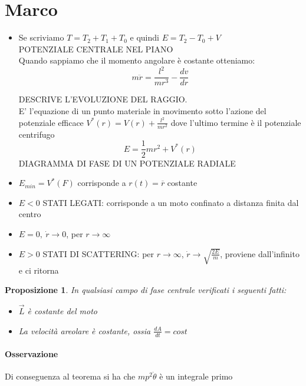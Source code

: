 \documentclass[a4paper,12pt]{article}
\begin{document}
\section{Marco}
\begin{itemize}


\item Se scriviamo $T=T_2+T_1+T_0$ e quindi $E=T_2-T_0+V$ \\
POTENZIALE CENTRALE NEL PIANO \\
Quando sappiamo che il momento angolare è costante otteniamo:
\begin{displaymath}
m\ddot{r}=\frac{l^2}{mr^3}-\frac{dv}{dr}
\end{displaymath}

DESCRIVE L'EVOLUZIONE DEL RAGGIO.\\
E' l'equazione di un punto materiale in movimento sotto l'azione del potenziale efficace $V^*(r)=V(r)+\frac{l^2}{mr^2}$ dove l'ultimo termine è il potenziale centrifugo
\begin{displaymath}
E=\frac{1}{2}mr^2 + V^*(r)
\end{displaymath}
DIAGRAMMA DI FASE DI UN POTENZIALE RADIALE
\item $E_{min}=V^*(F)$ corrisponde a $r(t)=\overline{r}$ costante
\item $E<0$ STATI LEGATI: corrisponde a un moto confinato a distanza finita dal centro
\item $E=0,\ \dot{r}\to0$, per $r\to\infty$
\item $E>0$ STATI DI SCATTERING: per $r\to\infty$, $\dot{r}\to\sqrt{\frac{2E}{m}}$, proviene dall'infinito e ci ritorna
\end{itemize}
\newtheorem{prop}{Proposizione}[section]

\begin{prop}
In qualsiasi campo di fase centrale verificati i seguenti fatti:
\begin{itemize} 
\item $\vec{L}$ è costante del moto
\item La velocità areolare è costante, ossia $\frac{dA}{dt}=cost$

\end{itemize}
 

\end{prop}
\paragraph{Osservazione} Di conseguenza al teorema si ha che $mp^2\dot{\theta}$ è un integrale primo
\end{document}
